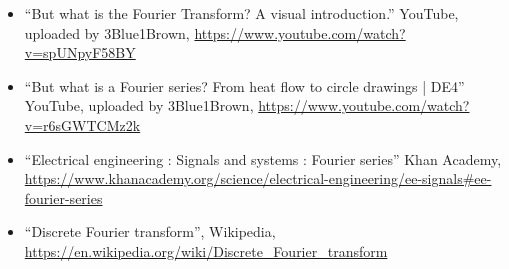 \documentclass[titlepage]{article}
\begin{document}
    \begin{itemize}
        \item ``But what is the Fourier Transform? A visual introduction.'' YouTube, 
            uploaded by 3Blue1Brown, \url{https://www.youtube.com/watch?v=spUNpyF58BY}
        \item ``But what is a Fourier series? From heat flow to circle drawings | DE4'' 
            YouTube, uploaded by 3Blue1Brown, \url{https://www.youtube.com/watch?v=r6sGWTCMz2k}
        \item ``Electrical engineering : Signals and systems : Fourier series'' Khan
            Academy, \url{https://www.khanacademy.org/science/electrical-engineering/ee-signals#ee-fourier-series} 
        \item ``Discrete Fourier transform'', Wikipedia, \url{https://en.wikipedia.org/wiki/Discrete_Fourier_transform}
    \end{itemize}
\end{document}
